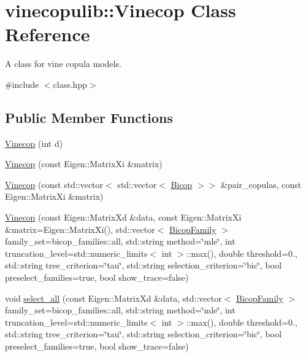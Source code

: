 \hypertarget{classvinecopulib_1_1_vinecop}{}\section{vinecopulib\+:\+:Vinecop Class Reference}
\label{classvinecopulib_1_1_vinecop}


A class for vine copula models.  




{\ttfamily \#include $<$class.\+hpp$>$}

\subsection*{Public Member Functions}
\begin{DoxyCompactItemize}
\item 
\hyperlink{classvinecopulib_1_1_vinecop_a7c6bae90feba9d70bf692e4d50d02bc7}{Vinecop} (int d)
\item 
\hyperlink{classvinecopulib_1_1_vinecop_a561fc84ab874520e6dab9107fc45579a}{Vinecop} (const Eigen\+::\+Matrix\+Xi \&matrix)
\item 
\hyperlink{classvinecopulib_1_1_vinecop_a013a9d4eef7eb5e615a18bb3c36fd5dc}{Vinecop} (const std\+::vector$<$ std\+::vector$<$ \hyperlink{classvinecopulib_1_1_bicop}{Bicop} $>$$>$ \&pair\+\_\+copulas, const Eigen\+::\+Matrix\+Xi \&matrix)
\item 
\hyperlink{classvinecopulib_1_1_vinecop_ae74d750f9f59c33cbb2047347c44a530}{Vinecop} (const Eigen\+::\+Matrix\+Xd \&data, const Eigen\+::\+Matrix\+Xi \&matrix=Eigen\+::\+Matrix\+Xi(), std\+::vector$<$ \hyperlink{family_8hpp_a42e95cc06d33896199caab0c11ad44f3}{Bicop\+Family} $>$ family\+\_\+set=bicop\+\_\+families\+::all, std\+::string method=\char`\"{}mle\char`\"{}, int truncation\+\_\+level=std\+::numeric\+\_\+limits$<$ int $>$\+::max(), double threshold=0., std\+::string tree\+\_\+criterion=\char`\"{}tau\char`\"{}, std\+::string selection\+\_\+criterion=\char`\"{}bic\char`\"{}, bool preselect\+\_\+families=true, bool show\+\_\+trace=false)
\item 
void \hyperlink{classvinecopulib_1_1_vinecop_a6f9f35b5973e0da272770706af77dc11}{select\+\_\+all} (const Eigen\+::\+Matrix\+Xd \&data, std\+::vector$<$ \hyperlink{family_8hpp_a42e95cc06d33896199caab0c11ad44f3}{Bicop\+Family} $>$ family\+\_\+set=bicop\+\_\+families\+::all, std\+::string method=\char`\"{}mle\char`\"{}, int truncation\+\_\+level=std\+::numeric\+\_\+limits$<$ int $>$\+::max(), double threshold=0., std\+::string tree\+\_\+criterion=\char`\"{}tau\char`\"{}, std\+::string selection\+\_\+criterion=\char`\"{}bic\char`\"{}, bool preselect\+\_\+families=true, bool show\+\_\+trace=false)
$$
\end{DoxyCompactItemize}
